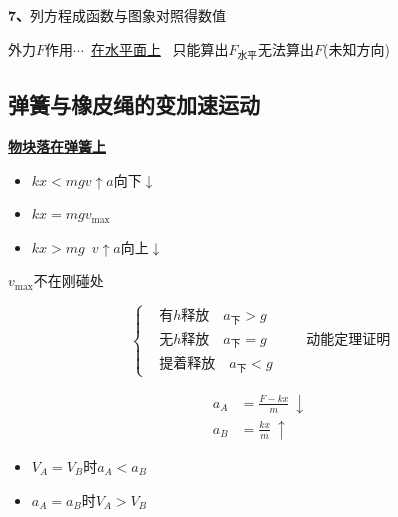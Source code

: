 \textbf{7、}列方程成函数与图象对照得数值

外力$F$作用$\cdots$\ \underline{在水平面上}\ %
只能算出$F_{\text{水平}}$\quad 无法算出$F$(未知方向)

\subsection{弹簧与橡皮绳的变加速运动}
\textbf{\underline{物块落在弹簧上}}


\begin{itemize}
\item[A] $kx<mg$\quad $v\uparrow$\quad $a$向下$\downarrow$
\item[O] $kx=mg$\quad $v_{\max}$
\item[B] $kx>mg$\quad {}\ $v\uparrow$\quad $a$向上$\downarrow$ %
\end{itemize}

$v_{\max}$不在刚碰处


\[
\left\{\begin{aligned}
&\text{有}h\text{释放}\quad a_{\text{下}}>g\\
&\text{无}h\text{释放}\quad a_{\text{下}}=g\\
&\text{提着释放}\quad a_{\text{下}}<g
\end{aligned}\right.
\qquad\text{动能定理证明}
\]

\begin{align*}
a_A&=\frac{F-kx}{m}\ \downarrow\\
a_B&=\frac{kx}{m}\ \uparrow
\end{align*}
\begin{itemize}
\item $V_A=V_B$时\quad $a_A<a_B$
\item $a_A=a_B$时\quad $V_A>V_B$
\end{itemize}

